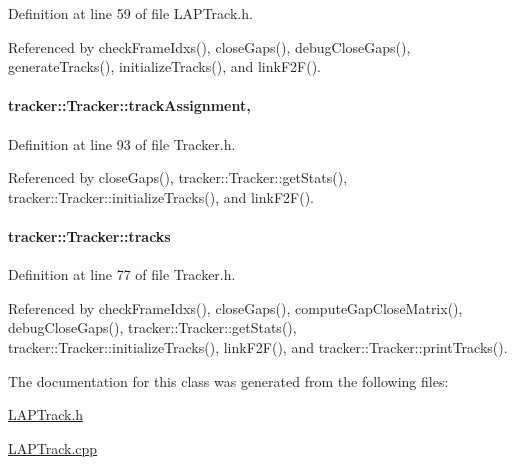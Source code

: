 Definition at line 59 of file L\+A\+P\+Track.\+h.



Referenced by check\+Frame\+Idxs(), close\+Gaps(), debug\+Close\+Gaps(), generate\+Tracks(), initialize\+Tracks(), and link\+F2\+F().

\paragraph[{\texorpdfstring{track\+Assignment}{trackAssignment}}]{ tracker\+::\+Tracker\+::track\+Assignment\hspace{0.3cm}{\ttfamily [protected]}, {\ttfamily [inherited]}}\hypertarget{classtracker_1_1Tracker_a638ecbd5a6466c2730e7c7b9561e9fc9}{}\label{classtracker_1_1Tracker_a638ecbd5a6466c2730e7c7b9561e9fc9}


Definition at line 93 of file Tracker.\+h.



Referenced by close\+Gaps(), tracker\+::\+Tracker\+::get\+Stats(), tracker\+::\+Tracker\+::initialize\+Tracks(), and link\+F2\+F().

\paragraph[{\texorpdfstring{tracks}{tracks}}]{ tracker\+::\+Tracker\+::tracks\hspace{0.3cm}{\ttfamily [inherited]}}\hypertarget{classtracker_1_1Tracker_a1e43335eb50e56014399a157b261160b}{}\label{classtracker_1_1Tracker_a1e43335eb50e56014399a157b261160b}


Definition at line 77 of file Tracker.\+h.



Referenced by check\+Frame\+Idxs(), close\+Gaps(), compute\+Gap\+Close\+Matrix(), debug\+Close\+Gaps(), tracker\+::\+Tracker\+::get\+Stats(), tracker\+::\+Tracker\+::initialize\+Tracks(), link\+F2\+F(), and tracker\+::\+Tracker\+::print\+Tracks().



The documentation for this class was generated from the following files\+:\begin{DoxyCompactItemize}
\item 
\hyperlink{LAPTrack_8h}{L\+A\+P\+Track.\+h}\item 
\hyperlink{LAPTrack_8cpp}{L\+A\+P\+Track.\+cpp}\end{DoxyCompactItemize}
